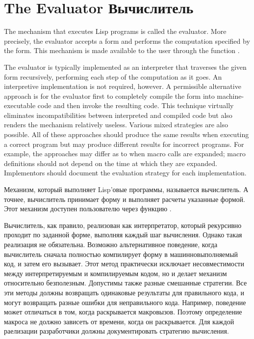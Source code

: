 
\clearpage\def\pagestatus{FINAL PROOF}

\chapter{The Evaluator Вычислитель}


The mechanism that executes Lisp programs is called the evaluator.
More precisely, the evaluator accepts a form and performs the
computation specified by the form.  This mechanism is made available
to the user through the function .

The evaluator is typically implemented as an interpreter
that traverses the given form recursively, performing each step
of the computation as it goes.  An interpretive implementation is not
required, however.  A permissible alternative approach is
for the evaluator first to completely compile the form into
machine-executable code and then invoke the resulting code.
This technique virtually eliminates incompatibilities
between interpreted and compiled code but also renders the 
mechanism relatively useless.
Various mixed strategies are also possible.  All of these approaches
should produce the same results when executing a correct program
but may produce different results for incorrect programs.
For example, the approaches may differ as to when macro calls
are expanded; macro definitions should not depend on the time
at which they are expanded.  Implementors should
document the evaluation strategy for each implementation.

Механизм, который выполняет Lisp'овые программы, называется вычислитель.
А точнее, вычислитель принимает форму и выполняет расчеты указанные формой.
Этот механизм доступен пользователю через функцию .

Вычислитель, как правило, реализован как интерпретатор, который рекурсивно
проходит по заданной форме, выполняя каждый шаг вычисления. Однако такая
реализация не обязательна. Возможно альтернативное поведение, когда вычислитель
сначала полностью компилирует форму в машинновыполняемый код, и затем его
вызывает.
Этот метод практически исключает несовместимости между интерпретируемым и
компилируемым кодом, но и делает механизм  относительно
безполезным.
Допустимы также разные смешанные стратегии. Все эти методы должны возвращать
одинаковые результаты для правильного кода, и могут возвращать разные ошибки для
неправильного кода.
Например, поведение может отличаться в том, когда раскрывается
макровызов. Поэтому определение макроса не должно зависеть от времени, когда он
раскрывается. Для каждой раелизации разработчики должны документировать
стратегию вычисления. 


